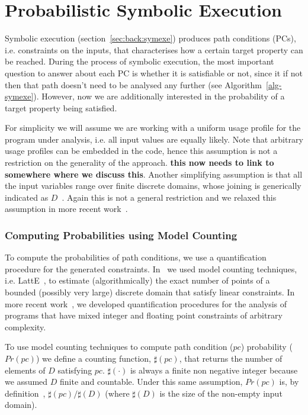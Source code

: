 \section{Probabilistic Symbolic Execution}
\label{sec:pse}

Symbolic execution (section~\ref{sec:back:symexe}) produces path conditions (PCs), i.e. constraints on the inputs, that characterises how a certain target property can be reached. During the process of symbolic execution, the most important question to answer about each PC is whether it is satisfiable or not, since it if not then that path doesn't need to be analysed any further (see Algorithm~\ref{alg-symexe}).  However, now we are additionally interested in the probability of a target property being satisfied. 

For simplicity we will assume we are working with a uniform usage profile for the program under analysis, i.e. all input values are equally likely. Note that arbitrary usage profiles can be embedded in the code, hence this assumption is not a restriction on the generality of the approach. {\bf this now needs to link to somewhere where we discuss this}. Another simplifying assumption is that all the input variables range over finite discrete domains, whose joining is generically indicated as $D$~\cite{filieri-etal-icse2013}. Again this is not a general restriction and we relaxed this assumption in more recent work~\cite{Borges2014PLDI}.

\subsubsection{Computing Probabilities using Model Counting} 
To compute the probabilities of path conditions, we use a
quantification procedure for the generated constraints.
In~\cite{filieri-etal-icse2013} we used model counting techniques,
i.e. LattE~\cite{deLoera-etal-2012}, to estimate (algorithmically) the exact
number of points of a bounded (possibly very large) discrete domain
that satisfy linear constraints.  In more recent work~\cite{Borges2014PLDI},  
we developed quantification procedures for
the analysis of programs that have mixed integer and floating point
constraints of arbitrary complexity.

To use model counting techniques to compute path condition ($pc$) probability ($Pr(pc)$) we define a counting function,  $\sharp(pc)$, that returns the number of elements of $D$ satisfying $pc$. $\sharp(\cdot)$ is always a finite non negative
integer because we assumed $D$ finite and countable. Under this same
assumption, $\textit{Pr}(pc)$ is, by definition~\cite{pestman2009},
$\sharp(pc) / \sharp(D)$ (where $\sharp(D)$ is the size of the non-empty
input domain). 

